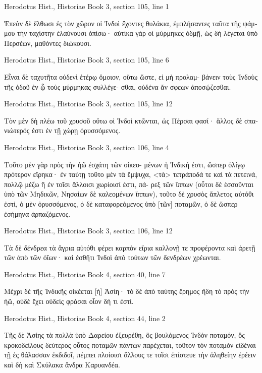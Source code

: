 \documentclass[12pt,letterpaper,twoside,final]{memoir}
\begin{document}
\begin{greek}
Herodotus Hist., Historiae 
Book 3, section 105, line 1

               Ἐπεὰν δὲ ἔλθωσι ἐς τὸν χῶρον οἱ Ἰνδοὶ 
ἔχοντες θυλάκια, ἐμπλήσαντες ταῦτα τῆς ψάμμου τὴν 
ταχίστην ἐλαύνουσι ὀπίσω· αὐτίκα γὰρ οἱ μύρμηκες ὀδμῇ, 
ὡς δὴ λέγεται ὑπὸ Περσέων, μαθόντες διώκουσι. 



Herodotus Hist., Historiae 
Book 3, section 105, line 6

                                                       Εἶναι δὲ 
ταχυτῆτα οὐδενὶ ἑτέρῳ ὅμοιον, οὕτω ὥστε, εἰ μὴ προλαμ-
βάνειν τοὺς Ἰνδοὺς τῆς ὁδοῦ ἐν ᾧ τοὺς μύρμηκας συλλέγε-
σθαι, οὐδένα ἄν σφεων ἀποσῴζεσθαι. 



Herodotus Hist., Historiae 
Book 3, section 105, line 12

                  Τὸν μὲν δὴ πλέω τοῦ χρυσοῦ οὕτω οἱ 
Ἰνδοὶ κτῶνται, ὡς Πέρσαι φασί· ἄλλος δὲ σπανιώτερός 
ἐστι ἐν τῇ χώρῃ ὀρυσσόμενος. 



Herodotus Hist., Historiae 
Book 3, section 106, line 4

             Τοῦτο μὲν γὰρ πρὸς τὴν ἠῶ ἐσχάτη τῶν οἰκεο-
μένων ἡ Ἰνδική ἐστι, ὥσπερ ὀλίγῳ πρότερον εἴρηκα· ἐν 
ταύτῃ τοῦτο μὲν τὰ ἔμψυχα, <τὰ> τετράποδά τε καὶ τὰ 
πετεινά, πολλῷ μέζω ἢ ἐν τοῖσι ἄλλοισι χωρίοισί ἐστι, πά-
ρεξ τῶν ἵππων (οὗτοι δὲ ἑσσοῦνται ὑπὸ τῶν Μηδικῶν,   
Νησαίων δὲ καλεομένων ἵππων), τοῦτο δὲ χρυσὸς ἄπλετος 
αὐτόθι ἐστί, ὁ μὲν ὀρυσσόμενος, ὁ δὲ καταφορεόμενος ὑπὸ 
[τῶν] ποταμῶν, ὁ δὲ ὥσπερ ἐσήμηνα ἁρπαζόμενος. 



Herodotus Hist., Historiae 
Book 3, section 106, line 12

                                                         Τὰ δὲ 
δένδρεα τὰ ἄγρια αὐτόθι φέρει καρπὸν εἴρια καλλονῇ τε 
προφέροντα καὶ ἀρετῇ τῶν ἀπὸ τῶν ὀΐων· καὶ ἐσθῆτι Ἰνδοὶ 
ἀπὸ τούτων τῶν δενδρέων χρέωνται. 



Herodotus Hist., Historiae 
Book 4, section 40, line 7

       Μέχρι δὲ τῆς Ἰνδικῆς οἰκέεται [ἡ] Ἀσίη· τὸ δὲ   
ἀπὸ ταύτης ἔρημος ἤδη τὸ πρὸς τὴν ἠῶ, οὐδὲ ἔχει οὐδεὶς 
φράσαι οἷον δή τι ἐστί. 



Herodotus Hist., Historiae 
Book 4, section 44, line 2

Τῆς δὲ Ἀσίης τὰ πολλὰ ὑπὸ Δαρείου ἐξευρέθη, ὃς 
βουλόμενος Ἰνδὸν ποταμόν, ὃς κροκοδείλους δεύτερος 
οὗτος ποταμῶν πάντων παρέχεται, τοῦτον τὸν ποταμὸν 
εἰδέναι τῇ ἐς θάλασσαν ἐκδιδοῖ, πέμπει πλοίοισι ἄλλους τε   
τοῖσι ἐπίστευε τὴν ἀληθείην ἐρέειν καὶ δὴ καὶ Σκύλακα 
ἄνδρα Καρυανδέα. 




\end{greek}
\end{document}
